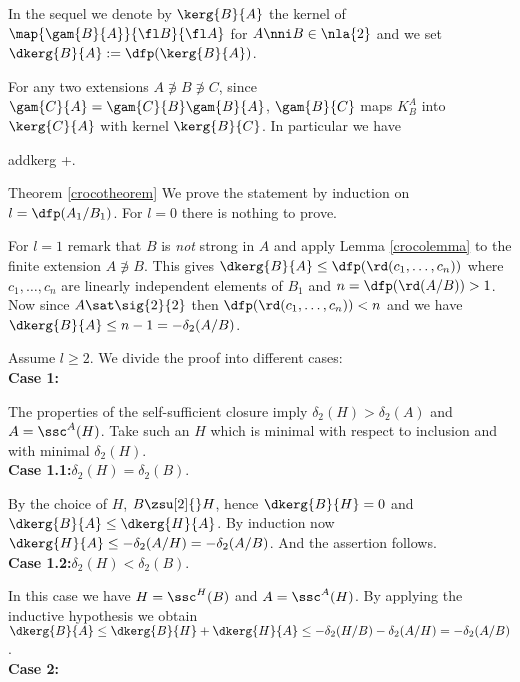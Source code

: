 \bigskip
In the sequel we denote by $\kerg{B}{A}$ the kernel of $\map{\gam{B}{A}}{\fl B}{\fl A}$ for $A\nni B\in\nla{2}$
and we set $\dkerg{B}{A}:=\dfp(\kerg{B}{A})$.

For any two extensions $A\nni B\nni C$,
since $\gam{C}{A}=\gam{C}{B}\gam{B}{A}$,
$\gam{B}{C}$ maps $K_{B}^{A}$ into $\kerg{C}{A}$ with kernel $\kerg{B}{C}$. In particular we have
\begin{labeq}{addkerg}
\leq{}+.
\end{labeq}


\begin{proofof}{Theorem \ref{crocotheorem}}
We prove the statement by induction on $l=\dfp(A_{1}/ B_{1})$. For $l=0$
there is nothing to prove.

For $l=1$ remark that $B$ is {\em not} strong in $A$ and
apply Lemma \ref{crocolemma} to the finite extension $A\nni B$. This gives $\dkerg{B}{A}\leq\dfp(\rd(c_{1},\dots,c_{n}))$ where
$c_{1},\dots, c_{n}$ are linearly independent elements of $B_{1}$ and $n=\dfp(\rd(A/B))>1$.
Now since $A\sat\sig{2}{2}$ then $\dfp(\rd(c_{1},\dots,c_{n}))<n$ and we have $\dkerg{B}{A}\leq n-1=-\delta_{2}(A/B)$.

\medskip
Assume $l\geq2$. We divide the proof into different cases:\\[+0.5mm]\noindent
{\bf Case 1:}

\smallskip
The properties of the self-sufficient closure imply $\delta_{2}(H)>\delta_{2}(A)$ and $A=\ssc^{A}(H)$. Take such an $H$ which is minimal with respect to inclusion and with minimal $\delta_{2}(H)$.\\[+1mm]\noindent
{\bf Case 1.{}1:}\quad$\delta_{2}(H)=\delta_{2}(B)$.

\smallskip
By the choice of $H$, $B\zsu[2]{}H$, hence $\dkerg{B}{H}=0$ and $\dkerg{B}{A}\leq\dkerg{H}{A}$.
By induction now $\dkerg{H}{A}\leq-\delta_{2}(A/H)=-\delta_{2}(A/B)$.
And the assertion follows.\\[+0.8mm]\noindent
{\bf Case 1.{}2:}\quad$\delta_{2}(H)<\delta_{2}(B)$.

\smallskip
In this case we have $H=\ssc^{H}(B)$ and $A=\ssc^{A}(H)$. By applying the inductive hypothesis we obtain
$\dkerg{B}{A}\leq\dkerg{B}{H}+\dkerg{H}{A}\leq-\delta_{2}(H/B)-\delta_{2}(A/H)=-\delta_{2}(A/B)$.\\[+2mm]\noindent
{\bf Case 2:}
 

\end{proofof}
